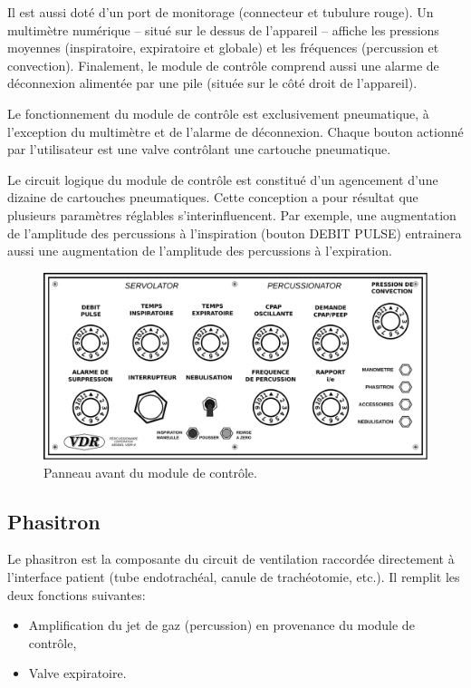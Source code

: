 Il est aussi doté d'un port de monitorage (connecteur et tubulure
rouge).  Un multimètre numérique -- situé sur le dessus de l'appareil
-- affiche les pressions moyennes (inspiratoire, expiratoire et
globale) et les fréquences (percussion et convection).  Finalement, le
module de contrôle comprend aussi une alarme de déconnexion alimentée
par une pile (située sur le côté droit de l'appareil).

Le fonctionnement du module de contrôle est exclusivement pneumatique,
à l'exception du multimètre et de l'alarme de déconnexion.  Chaque
bouton actionné par l'utilisateur est une valve contrôlant une
cartouche pneumatique. 

Le circuit logique du module de contrôle est constitué d'un agencement
d'une dizaine de cartouches pneumatiques.  Cette conception a pour
résultat que plusieurs paramètres réglables s'interinfluencent.  Par
exemple, une augmentation de l'amplitude des percussions à
l'inspiration (bouton DEBIT PULSE) entrainera aussi une augmentation
de l'amplitude des percussions à l'expiration.

\begin{figure}[t]
	\includegraphics[width=\textwidth]{img/Module_de_controle}
	\caption{Panneau avant du module de contrôle.}
\end{figure}

\subsection{Phasitron}

Le phasitron est la composante du circuit de ventilation raccordée
directement à l'interface patient (tube endotrachéal, canule de
trachéotomie, etc.). Il remplit les deux fonctions suivantes: 

\begin{itemize} 
	\item Amplification du jet de gaz (percussion) en provenance du
		module de contrôle,
	\item Valve expiratoire.
\end{itemize}

